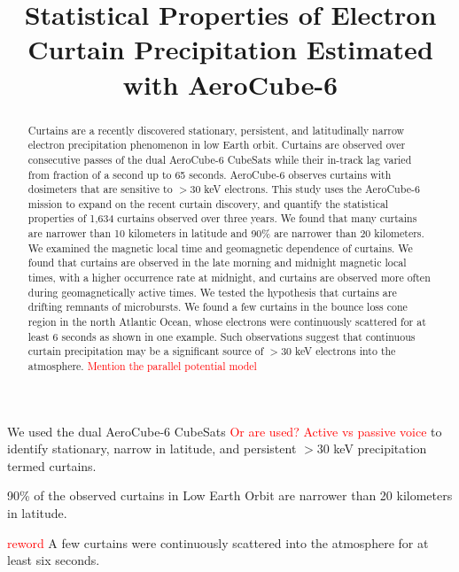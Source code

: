 \documentclass[draft]{agujournal2019}
\begin{document}
\title{Statistical Properties of Electron Curtain Precipitation Estimated with AeroCube-6}

%
%






\begin{keypoints}
\item We used the dual AeroCube-6 CubeSats \textcolor{red}{Or are used? Active vs passive voice} to identify stationary, narrow in latitude, and persistent $>30$ keV precipitation termed curtains.
\item 90\% of the observed curtains in Low Earth Orbit are narrower than 20 kilometers in latitude.
\item \textcolor{red}{reword} A few curtains were continuously scattered into the atmosphere for at least six seconds.
\end{keypoints}


\begin{abstract}
Curtains are a recently discovered stationary, persistent, and latitudinally narrow electron precipitation phenomenon in low Earth orbit. Curtains are observed over consecutive passes of the dual AeroCube-6 CubeSats while their in-track lag varied from fraction of a second up to 65 seconds. AeroCube-6 observes curtains with dosimeters that are sensitive to $> 30$ keV electrons. This study uses the AeroCube-6 mission to expand on the recent curtain discovery, and quantify the statistical properties of 1,634 curtains observed over three years. We found that many curtains are narrower than 10 kilometers in latitude and 90\% are narrower than 20 kilometers. We examined the magnetic local time and geomagnetic dependence of curtains. We found that curtains are observed in the late morning and midnight magnetic local times, with a higher occurrence rate at midnight, and curtains are observed more often during geomagnetically active times. We tested the hypothesis that curtains are drifting remnants of microbursts. We found a few curtains in the bounce loss cone region in the north Atlantic Ocean, whose electrons were continuously scattered for at least 6 seconds as shown in one example. Such observations suggest that continuous curtain precipitation may be a significant source of $> 30$ keV electrons into the atmosphere. \textcolor{red}{Mention the parallel potential model}
\end{abstract}
\end{document}
